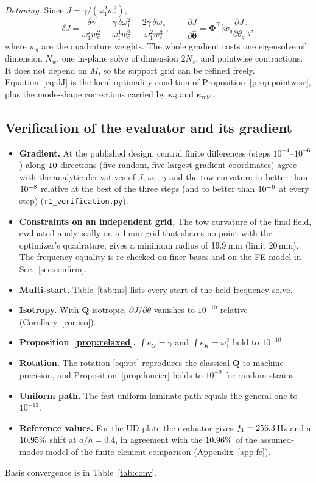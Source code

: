 \emph{Detuning.} Since $J=\gamma/(\omega_1^2w_c^2)$,
\begin{equation}
\delta J=\frac{\delta\gamma}{\omega_1^2w_c^2}-\frac{\gamma\,\delta\omega_1^2}{\omega_1^4w_c^2}
-\frac{2\gamma\,\delta w_c}{\omega_1^2w_c^3},\qquad
\frac{\partial J}{\partial\hat{\bm\theta}}=\bm\Phi^{\!\top}\Big[w_q\frac{\partial J}{\partial\theta_q}\Big]_q ,
\label{eq:dJ}
\end{equation}
where $w_q$ are the quadrature weights. The whole gradient costs one eigensolve of
dimension $N_w$, one in-plane solve of dimension $2N_s$, and pointwise contractions. It
does not depend on $M$, so the support grid can be refined freely.
Equation~\eqref{eq:dJ} is the local optimality condition of
Proposition~\ref{prop:pointwise}, plus the mode-shape corrections carried by
$\bm\kappa_\beta$ and $\bm\kappa_{\mathrm{mid}}$.

\subsection{Verification of the evaluator and its gradient}\label{sec:verify}
\begin{itemize}[itemsep=1pt]
\item \textbf{Gradient.} At the published design, central finite differences (steps $10^{-4}$--$10^{-6}$)
  along $10$ directions (five random, five largest-gradient coordinates) agree with the analytic
  derivatives of $J$, $\omega_1$, $\gamma$ and the tow curvature to better than $10^{-8}$ relative at the
  best of the three steps (and to better than $10^{-6}$ at every step)
  (\texttt{r1\_\allowbreak verification.py}).
\item \textbf{Constraints on an independent grid.} The tow curvature of the final field, evaluated
  analytically on a 1\,mm grid that shares no point with the optimizer's quadrature, gives a minimum
  radius of $19.9$\,mm (limit 20\,mm). The frequency equality is re-checked on finer bases and on
  the FE model in Sec.~\ref{sec:confirm}.
\item \textbf{Multi-start.} Table~\ref{tab:ms} lists every start of the held-frequency solve.
\item \textbf{Isotropy.} With $\bm Q$ isotropic, $\partial J/\partial\theta$ vanishes to
  $10^{-10}$ relative (Corollary~\ref{cor:iso}).
\item \textbf{Proposition~\ref{prop:relaxed}.} $\int e_G=\gamma$ and $\int e_K=\omega_1^2$
  hold to $10^{-10}$.
\item \textbf{Rotation.} The rotation \eqref{eq:rot} reproduces the classical $\bar{\bm Q}$
  to machine precision, and Proposition~\ref{prop:fourier} holds to $10^{-9}$ for random
  strains.
\item \textbf{Uniform path.} The fast uniform-laminate path equals the general one to
  $10^{-13}$.
\item \textbf{Reference values.} For the UD plate the evaluator gives $f_1=256.3$\,Hz and a
  $10.95\%$ shift at $a/h=0.4$, in agreement with the $10.96\%$ of the assumed-modes
  model of the finite-element comparison (Appendix~\ref{app:fe}).
\end{itemize}
Basis convergence is in Table~\ref{tab:conv}.

